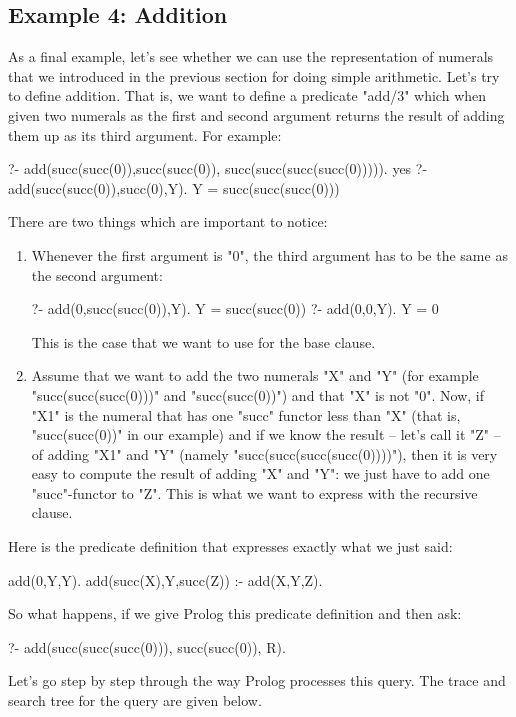 \subsection*{Example 4: Addition}\label{SUBSEC.L3.EX4}



As a final example, let's see whether we can use the representation of
numerals that we introduced in the previous section for doing simple
arithmetic. Let's try to define addition. That is, we want to define a
predicate "add/3" which when given two numerals as the
first and second argument returns the result of adding them up as its
third argument. For example:
\begin{LPNcodedisplay}
?- add(succ(succ(0)),succ(succ(0)),
       succ(succ(succ(succ(0))))).
yes
?- add(succ(succ(0)),succ(0),Y).
Y = succ(succ(succ(0)))
\end{LPNcodedisplay}

There are two things which are important to notice:
\begin{enumerate}
\item{}Whenever the first argument is "0", the third argument has
to be the same as the second argument:
\begin{LPNcodedisplay}
?- add(0,succ(succ(0)),Y).
Y = succ(succ(0))
?- add(0,0,Y).
Y = 0
\end{LPNcodedisplay}

This is the case that we want to use for the base clause.
\item{}Assume that we want to add the two numerals "X" and "Y"
(for example  "succ(succ(succ(0)))" and "succ(succ(0))") and that
"X" is not "0". Now, if
"X1" is the numeral that has one "succ" functor less than
"X" (that is, "succ(succ(0))" in our example) and if we know the
result -- let's call it "Z" -- of adding "X1" and "Y"
(namely "succ(succ(succ(succ(0))))"), then it is very easy to
compute the result of adding "X" and "Y": we just have to
add one "succ"-functor to "Z". This is what we want to
express with the recursive clause.
\end{enumerate}

Here is the predicate definition that expresses exactly what we just said:
\begin{LPNcodedisplay}
add(0,Y,Y).
add(succ(X),Y,succ(Z)) :-
        add(X,Y,Z).
\end{LPNcodedisplay}

So what happens, if we give Prolog this predicate definition and then
ask:
\begin{LPNcodedisplay}
?- add(succ(succ(succ(0))), succ(succ(0)), R).
\end{LPNcodedisplay}
 Let's go step by step through the way Prolog processes this
query. The trace and search tree for the query are given below.

